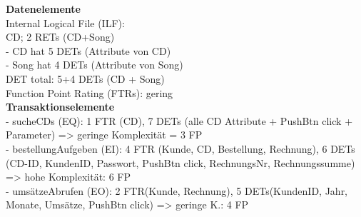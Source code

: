 \begin{multicols}{2}


\columnbreak
\textbf{Datenelemente} \\
Internal Logical File (ILF): \\
CD; 2 RETs (CD+Song) \\
- CD hat 5 DETs (Attribute von CD) \\
- Song hat 4 DETs (Attribute von Song) \\
DET total: 5+4 DETs (CD + Song)\\
Function Point Rating (FTRs): gering \\
\textbf{Transaktionselemente} \\
- sucheCDs (EQ): 1 FTR (CD), 7 DETs (alle CD Attribute + PushBtn click + Parameter) => geringe Komplexität = 3 FP \\
- bestellungAufgeben (EI): 4 FTR (Kunde, CD, Bestellung, Rechnung), 6 DETs (CD-ID, KundenID, Passwort, PushBtn click, RechnungsNr, Rechnungssumme) => hohe Komplexität: 6 FP \\
- umsätzeAbrufen (EO): 2 FTR(Kunde, Rechnung), 5 DETs(KundenID, Jahr, Monate, Umsätze, PushBtn click) => geringe K.: 4 FP	
\end{multicols}


